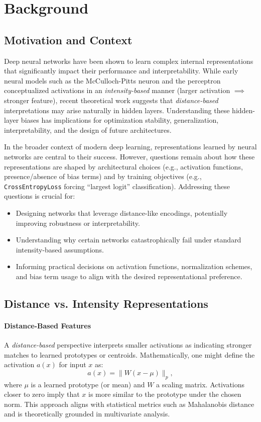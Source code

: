\section{Background}

\subsection{Motivation and Context}
Deep neural networks have been shown to learn complex internal representations that significantly impact their performance and interpretability. While early neural models such as the McCulloch-Pitts neuron  and the perceptron  conceptualized activations in an \emph{intensity-based} manner (larger activation $\implies$ stronger feature), recent theoretical work suggests that \emph{distance-based} interpretations may arise naturally in hidden layers. Understanding these hidden-layer biases has implications for optimization stability, generalization, interpretability, and the design of future architectures.

In the broader context of modern deep learning, representations learned by neural networks are central to their success. However, questions remain about how these representations are shaped by architectural choices (e.g., activation functions, presence/absence of bias terms) and by training objectives (e.g., \texttt{CrossEntropyLoss} forcing “largest logit” classification). Addressing these questions is crucial for:
\begin{itemize}
    \item Designing networks that leverage distance-like encodings, potentially improving robustness or interpretability.
    \item Understanding why certain networks catastrophically fail under standard intensity-based assumptions.
    \item Informing practical decisions on activation functions, normalization schemes, and bias term usage to align with the desired representational preference.
\end{itemize}

\subsection{Distance vs. Intensity Representations}

\paragraph{Distance-Based Features}
A \emph{distance-based} perspective interprets smaller activations as indicating stronger matches to learned prototypes or centroids. Mathematically, one might define the activation $a(x)$ for input $x$ as:
\begin{equation}
    a(x) = \|W(x - \mu)\|_p,
    \label{eq:distance-based}
\end{equation}
where $\mu$ is a learned prototype (or mean) and $W$ a scaling matrix. Activations closer to zero imply that $x$ is more similar to the prototype under the chosen norm. This approach aligns with statistical metrics such as Mahalanobis distance and is theoretically grounded in multivariate analysis.

